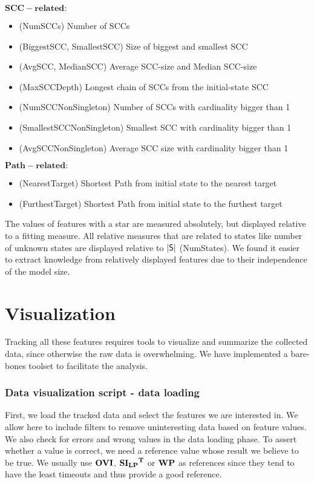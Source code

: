 $\mathbf{SCC-related:}$
\begin{itemize}
\item (NumSCCs) Number of SCCs
\item (BiggestSCC, SmallestSCC) Size of biggest and smallest SCC
\item (AvgSCC, MedianSCC) Average SCC-size and Median SCC-size
\item (MaxSCCDepth) Longest chain of SCCs from the initial-state SCC
\item (NumSCCNonSingleton) Number of SCCs with cardinality bigger than 1
\item (SmallestSCCNonSingleton) Smallest SCC with cardinality bigger than 1
\item (AvgSCCNonSingleton) Average SCC size with cardinality bigger than 1
\end{itemize}

$\mathbf{Path-related}:$
\begin{itemize}
    \item (NearestTarget) Shortest Path from initial state to the nearest target
    \item (FurthestTarget) Shortest Path from initial state to the furthest target
\end{itemize}

The values of features with a star are measured absolutely, but displayed relative to a fitting measure.
All relative measures that are related to states like number of unknown states are displayed relative to $|\mathsf{S}|$ (NumStates).
We found it easier to extract knowledge from relatively displayed features due to their independence of the model size. 

\section*{Visualization}

Tracking all these features requires tools to visualize and summarize the collected data, since otherwise the raw data is overwhelming.
We have implemented a bare-bones toolset to facilitate the analysis. 

\subsubsection*{Data visualization script - data loading}
First, we load the tracked data and select the features we are interested in. We allow here to include filters to remove uninteresting data based on feature values.
We also check for errors and wrong values in the data loading phase. To assert whether a value is correct, we need a reference value whose result we believe to be true.
We usually use $\mathbf{OVI}$, $\mathbf{\mathbf{SI_{LP}}^T}$ or $\mathbf{WP}$ as references since they tend to have the least timeouts and thus provide a good reference.

